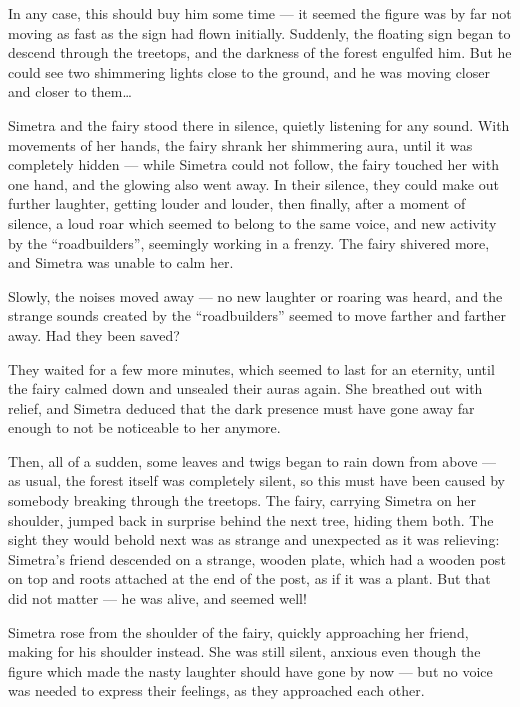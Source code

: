 In any case, this should buy him some time --- it seemed the figure was by far not moving as fast as the sign had flown initially. Suddenly, the floating sign began to descend through the treetops, and the darkness of the forest engulfed him. But he could see two shimmering lights close to the ground, and he was moving closer and closer to them\dots{}

\froufrou{}

Simetra and the fairy stood there in silence, quietly listening for any sound. With movements of her hands, the fairy shrank her shimmering aura, until it was completely hidden --- while Simetra could not follow, the fairy touched her with one hand, and the glowing also went away. In their silence, they could make out further laughter, getting louder and louder, then finally, after a moment of silence, a loud roar which seemed to belong to the same voice, and new activity by the \enquote{roadbuilders}, seemingly working in a frenzy. The fairy shivered more, and Simetra was unable to calm her.

Slowly, the noises moved away --- no new laughter or roaring was heard, and the strange sounds created by the \enquote{roadbuilders} seemed to move farther and farther away. Had they been saved?

They waited for a few more minutes, which seemed to last for an eternity, until the fairy calmed down and unsealed their auras again. She breathed out with relief, and Simetra deduced that the dark presence must have gone away far enough to not be noticeable to her anymore.

Then, all of a sudden, some leaves and twigs began to rain down from above --- as usual, the forest itself was completely silent, so this must have been caused by somebody breaking through the treetops. The fairy, carrying Simetra on her shoulder, jumped back in surprise behind the next tree, hiding them both. The sight they would behold next was as strange and unexpected as it was relieving: Simetra's friend descended on a strange, wooden plate, which had a wooden post on top and roots attached at the end of the post, as if it was a plant. But that did not matter --- he was alive, and seemed well!

Simetra rose from the shoulder of the fairy, quickly approaching her friend, making for his shoulder instead. She was still silent, anxious even though the figure which made the nasty laughter should have gone by now --- but no voice was needed to express their feelings, as they approached each other.

